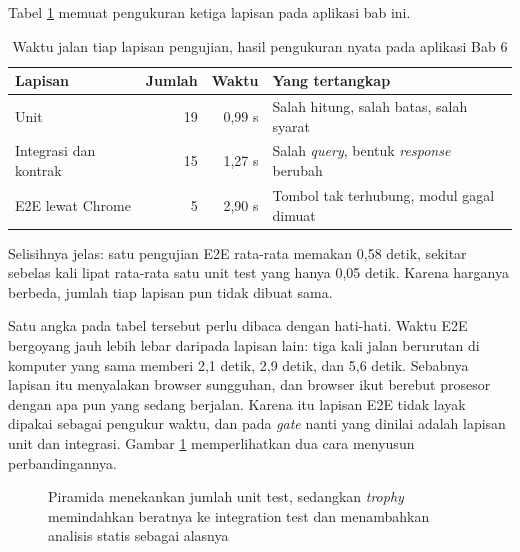 Tabel \ref{tab:lapisan} memuat pengukuran ketiga lapisan pada aplikasi bab
ini.

\begin{table}[!htb]
  \centering
  \caption{Waktu jalan tiap lapisan pengujian, hasil pengukuran nyata pada
           aplikasi Bab 6}
  \label{tab:lapisan}
  \begin{tabularx}{\textwidth}{lrrX}
    \hline
    \textbf{Lapisan} & \textbf{Jumlah} & \textbf{Waktu} & \textbf{Yang tertangkap} \\
    \hline
    Unit & 19 & 0,99 s & Salah hitung, salah batas, salah syarat \\
    \hline
    Integrasi dan kontrak & 15 & 1,27 s & Salah \textit{query}, bentuk \textit{response} berubah \\
    \hline
    E2E lewat Chrome & 5 & 2,90 s & Tombol tak terhubung, modul gagal dimuat \\
    \hline
  \end{tabularx}
\end{table}

Selisihnya jelas: satu pengujian E2E rata-rata memakan 0,58 detik, sekitar
sebelas kali lipat rata-rata satu unit test yang hanya 0,05 detik. Karena
harganya berbeda, jumlah tiap lapisan pun tidak dibuat sama.

Satu angka pada tabel tersebut perlu dibaca dengan hati-hati. Waktu E2E
bergoyang jauh lebih lebar daripada lapisan lain: tiga kali jalan berurutan
di komputer yang sama memberi 2,1 detik, 2,9 detik, dan 5,6 detik. Sebabnya
lapisan itu menyalakan browser sungguhan, dan browser ikut berebut prosesor
dengan apa pun yang sedang berjalan. Karena itu lapisan E2E tidak layak
dipakai sebagai pengukur waktu, dan pada \textit{gate} nanti yang dinilai
adalah lapisan unit dan integrasi. Gambar \ref{fig:piramida} memperlihatkan dua cara menyusun
perbandingannya.

\begin{figure}[!htb]
  \centering
  \caption{Piramida menekankan jumlah unit test, sedangkan \textit{trophy}
           memindahkan beratnya ke integration test dan menambahkan analisis
           statis sebagai alasnya}
  \label{fig:piramida}
\end{figure}

